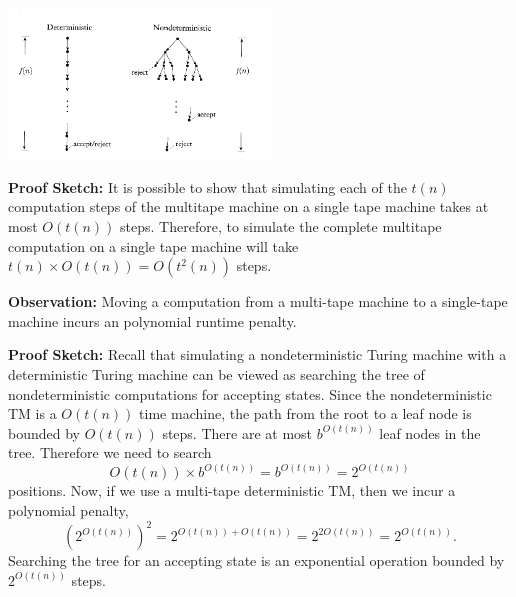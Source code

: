 \documentclass[a4paper,blends,pdf,colorBG,slideColor]{prosper}
\begin{document}

\begin{center}
\includegraphics[height=40mm]{images/ntime.eps}
\end{center}
\es



{\bf Proof Sketch:} It is possible to show that simulating each of the $t(n)$ computation steps of the multitape machine
on a single tape machine takes at most $O(t(n))$ steps.  Therefore, to simulate the complete multitape
computation on a single tape machine will take $t(n)\times O(t(n)) = O(t^2(n))$ steps.

{\bf Observation:} Moving a computation from a multi-tape machine to a single-tape machine incurs an polynomial runtime penalty.
\es




\scriptsize
{\bf Proof Sketch:} Recall that simulating a nondeterministic Turing machine with a deterministic Turing machine can be viewed as searching the tree of nondeterministic computations for accepting states.
Since the nondeterministic TM is a $O(t(n))$ time machine, the path from the root to a leaf node is bounded by $O(t(n))$ steps.  There are at most $b^{O(t(n))}$ leaf nodes in the tree.  Therefore we need to search
\[
O(t(n))\times b^{O(t(n))} = b^{O(t(n))} = 2^{O(t(n))} 
\]
positions.  Now, if we use a multi-tape deterministic TM, then we incur a polynomial penalty,
\[
(2^{O(t(n))})^2 = 2^{O(t(n)) + O(t(n))} = 2^{2O(t(n))} = 2^{O(t(n))}.
\]
Searching the tree for an accepting state is an exponential operation bounded by $2^{O(t(n))}$ steps.
\end{document}
